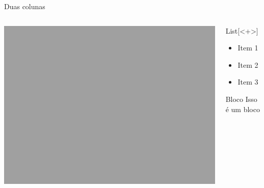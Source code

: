 \documentclass[aspectratio=1610, 12pt]{beamer}
\begin{document}
\begin{frame}{Duas colunas}
	
	\begin{columns}
		\begin{column}{0.5\textwidth}
			\centering
			\includegraphics[width=.7\textwidth]{fig/eventLogo}
		\end{column}
		
		\begin{column}{0.5\textwidth}  %
			\begin{block}{List}[<+>]
				\begin{itemize}
					\item Item 1
					\item Item 2
					\item Item 3
				\end{itemize}
			\end{block}
			
			\begin{block}{Bloco}
					Isso é um bloco
			\end{block}
		\end{column}
	\end{columns}
	
\end{frame}

	
\end{document}
